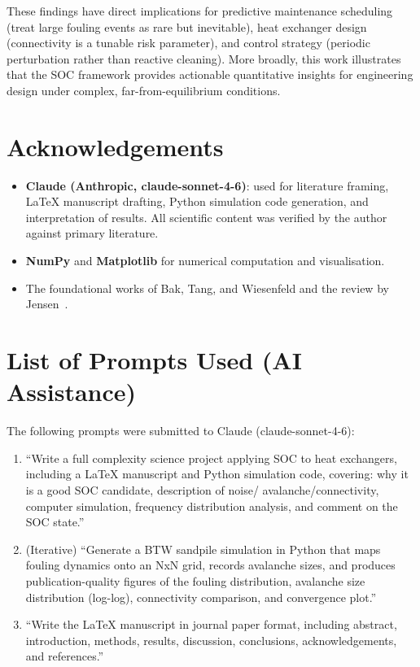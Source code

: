 \documentclass[10pt,a4paper,twocolumn]{article}
\begin{document}
These findings have direct implications for predictive maintenance scheduling
(treat large fouling events as rare but inevitable), heat exchanger design
(connectivity is a tunable risk parameter), and control strategy (periodic
perturbation rather than reactive cleaning). More broadly, this work
illustrates that the SOC framework provides actionable quantitative insights
for engineering design under complex, far-from-equilibrium conditions.

\section*{Acknowledgements}

\begin{itemize}
  \item \textbf{Claude (Anthropic, claude-sonnet-4-6)}: used for literature
        framing, LaTeX manuscript drafting, Python simulation code generation,
        and interpretation of results. All scientific content was verified by
        the author against primary literature.
  \item \textbf{NumPy} and \textbf{Matplotlib} for numerical computation and
        visualisation.
  \item The foundational works of Bak, Tang, and Wiesenfeld
        \cite{bak1987,bak1996} and the review by Jensen~\cite{jensen1998}.
\end{itemize}

\section*{List of Prompts Used (AI Assistance)}

The following prompts were submitted to Claude (claude-sonnet-4-6):
\begin{enumerate}
  \item ``Write a full complexity science project applying SOC to heat
        exchangers, including a LaTeX manuscript and Python simulation code,
        covering: why it is a good SOC candidate, description of noise/
        avalanche/connectivity, computer simulation, frequency distribution
        analysis, and comment on the SOC state.''
  \item (Iterative) ``Generate a BTW sandpile simulation in Python that maps
        fouling dynamics onto an NxN grid, records avalanche sizes, and
        produces publication-quality figures of the fouling distribution,
        avalanche size distribution (log-log), connectivity comparison, and
        convergence plot.''
  \item ``Write the LaTeX manuscript in journal paper format, including
        abstract, introduction, methods, results, discussion, conclusions,
        acknowledgements, and references.''
\end{enumerate}
\end{document}

